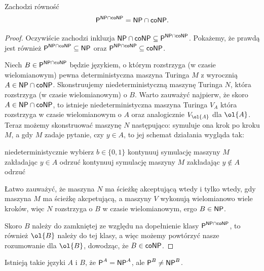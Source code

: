 \begin{fact}
    Zachodzi równość
    \[ \textsf{P}^{\textsf{NP} \cap \textsf{coNP}} = \textsf{NP} \cap \textsf{coNP}. \]
\end{fact}
\begin{proof}
    Oczywiście zachodzi inkluzja $\textsf{NP} \cap \textsf{coNP} \subseteq \textsf{P}^{\textsf{NP} \cap \textsf{coNP}}$.
    Pokażemy, że prawdą jest również $\textsf{P}^{\textsf{NP} \cap \textsf{coNP}} \subseteq \textsf{NP}$ oraz $\textsf{P}^{\textsf{NP} \cap \textsf{coNP}} \subseteq \textsf{coNP}$.

    Niech $B \in \textsf{P}^{\textsf{NP} \cap \textsf{coNP}}$ będzie językiem, o którym rozstrzyga (w czasie wielomianowym) pewna deterministyczna maszyna Turinga $M$ z wyrocznią $A \in \textsf{NP} \cap \textsf{coNP}$.
    Skonstruujemy niedeterministyczną maszynę Turinga $N$, która rozstrzyga (w czasie wielomianowym) o $B$.
    Warto zauważyć najpierw, że skoro $A \in \textsf{NP} \cap \textsf{coNP}$, to istnieje niedeterministyczna maszyna Turinga $V_A$ która rozstrzyga w czasie wielomianowym o $A$ oraz analogicznie $V_{\ol{A}}$ dla $\ol{A}$.
    Teraz możemy skonstruować maszynę $N$ następująco: symuluje ona krok po kroku $M$, a gdy $M$ zadaje pytanie, czy $y \in A$, to jej schemat działania wygląda tak:
    \begin{algorithmic}
        \State niedeterministycznie wybierz $b \in \{0, 1\}$ 
                \State kontynuuj symulację maszyny $M$ zakładając $y \in A$
            \Else
                \State odrzuć
            \EndIf
                \State kontynuuj symulację maszyny $M$ zakładając $y \notin A$
            \Else
                \State odrzuć
            \EndIf
        \EndIf
    \end{algorithmic}
    Łatwo zauważyć, że maszyna $N$ ma ścieżkę akceptującą wtedy i tylko wtedy, gdy maszyna $M$ ma ścieżkę akcpetującą, a maszyny $V$ wykonują wielomianowo wiele kroków, więc $N$ rozstrzyga o $B$ w czasie wielomianowym, ergo $B \in \textsf{NP}$.

    Skoro $B$ należy do zamkniętej ze względu na dopełnienie klasy $\textsf{P}^{\textsf{NP} \cap \textsf{coNP}}$, to również $\ol{B}$ należy do tej klasy, a więc możemy powtórzyć nasze rozumowanie dla $\ol{B}$, dowodząc, że $B \in \textsf{coNP}$.
\end{proof}

\begin{theorem}
    Istnieją takie języki $A$ i $B$, że $\textsf{P}^A = \textsf{NP}^A$, ale $\textsf{P}^B \neq \textsf{NP}^B$.
\end{theorem}

